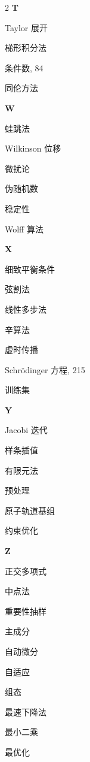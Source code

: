 \begin{multicols}{2}
\medskip\textbf{T}\par
Taylor 展开\par
梯形积分法\par
条件数, 84\par
同伦方法

\medskip\textbf{W}\par
蛙跳法\par
Wilkinson 位移\par
微扰论\par
伪随机数\par
稳定性\par
Wolff 算法

\medskip\textbf{X}\par
细致平衡条件\par
弦割法\par
线性多步法\par
辛算法\par
虚时传播\par
Schrödinger 方程, 215\par
训练集

\medskip\textbf{Y}\par
Jacobi 迭代\par
样条插值\par
有限元法\par
预处理\par
原子轨道基组\par
约束优化

\medskip\textbf{Z}\par
正交多项式\par
中点法\par
重要性抽样\par
主成分\par
自动微分\par
自适应\par
组态\par
最速下降法\par
最小二乘\par
最优化
\end{multicols}
\normalsize
